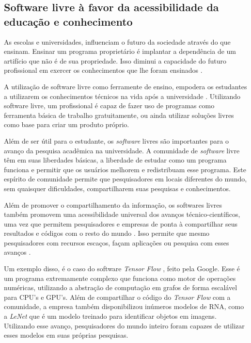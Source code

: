 \subsection{Software livre à favor da acessibilidade da educação e conhecimento}

As escolas e universidades, influenciam o futuro da sociedade através do que ensinam. Ensinar um programa proprietário é implantar a dependência de um artifício que não é de sua propriedade. Isso diminui a capacidade do futuro profissional em exercer os conhecimentos que lhe foram ensinados \cite{RichardStallman}.  

A utilização de software livre como ferramente de ensino, empodera os estudantes a utilizarem os conhecimentos técnicos na vida após a universidade \cite{Lessig2002}. Utilizando software livre, um profissional é capaz de fazer uso de programas como ferramenta básica de trabalho gratuitamente, ou ainda utilizar soluções livres como base para criar um produto próprio.

Além de ser útil para o estudante, os \textit{software} livres são importantes para o avanço da pesquisa acadêmica na universidade. A comunidade de \textit{software} livre têm em suas liberdades básicas, a liberdade de estudar como um programa funciona e permitir que os usuários melhorem e redistribuam esse programa. Este espírito de comunidade permite que pesquisadores em locais diferentes do mundo, sem quaisquer dificuldades, compartilharem suas pesquisas e conhecimentos.  

Além de promover o compartilhamento da informação, os softwares livres também promovem uma  acessibilidade universal dos avanços técnico-científicos, uma vez que permitem pesquisadores e empresas de ponta à compartilhar seus resultados e códigos com o resto do mundo \cite{Lessig2002}. Isso permite que mesmo pesquisadores com recursos escaços, façam aplicações ou pesquisa com esses avanços .

Um exemplo disso, é o caso do software \textit{Tensor Flow} \cite{AbadiABBCCCDDDG16}, feito pela Google. Esse é um programa extremamente complexo que funciona como motor de operações numéricas, utilizando a abstração de computação em grafos de forma escalável para CPU's e GPU's. Além de compartilhar o código do \textit{Tensor Flow} com a comunidade, a empresa também disponibilizou inúmeros modelos de RNA, como a \textit{LeNet} \cite{szegedy2015going} que é um modelo treinado para identificar objetos em imagens. Utilizando esse avanço, pesquisadores do mundo inteiro foram capazes de utilizar esses modelos em suas próprias pesquisas.








